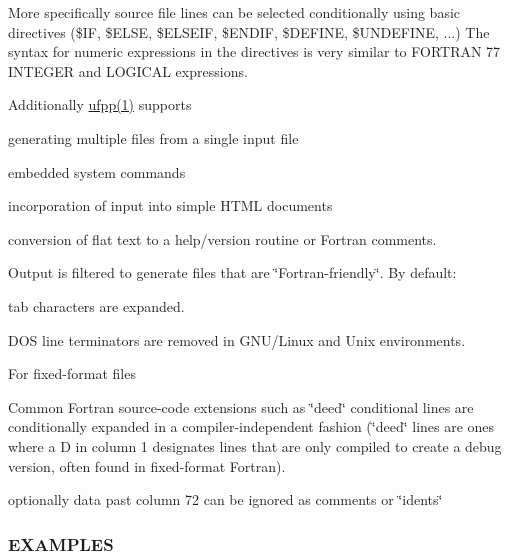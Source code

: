 More specifically source file lines can be selected conditionally using basic directives (\$\+IF, \$\+E\+L\+SE, \$\+E\+L\+S\+E\+IF, \$\+E\+N\+D\+IF, \$\+D\+E\+F\+I\+NE, \$\+U\+N\+D\+E\+F\+I\+NE, ...) The syntax for numeric expressions in the directives is very similar to F\+O\+R\+T\+R\+AN 77 I\+N\+T\+E\+G\+ER and L\+O\+G\+I\+C\+AL expressions. 

Additionally \hyperlink{ufpp__overview_81_8txt_a97c20a96bcab81bc74c9d64b001f1202}{ufpp(1)} supports 


\begin{DoxyItemize}
\item generating multiple files from a single input file  
\item embedded system commands  
\item incorporation of input into simple H\+T\+ML documents  
\item conversion of flat text to a help/version routine or Fortran comments. 


\item Output is filtered to generate files that are \char`\"{}\+Fortran-\/friendly\char`\"{}. By default\+: 
\begin{DoxyItemize}
\item tab characters are expanded.  
\item D\+OS line terminators are removed in G\+N\+U/\+Linux and Unix environments.  
\item For fixed-\/format files 
\begin{DoxyItemize}
\item Common Fortran source-\/code extensions such as \char`\"{}dee\textquotesingle{}d\char`\"{} conditional lines are conditionally expanded in a compiler-\/independent fashion (\char`\"{}dee\textquotesingle{}d\char`\"{} lines are ones where a \textquotesingle{}D\textquotesingle{} in column 1 designates lines that are only compiled to create a debug version, often found in fixed-\/format Fortran).  
\item optionally data past column 72 can be ignored as comments or \char`\"{}idents\char`\"{}  
\end{DoxyItemize}


\end{DoxyItemize}
\end{DoxyItemize}

\subsubsection*{E\+X\+A\+M\+P\+L\+ES}

